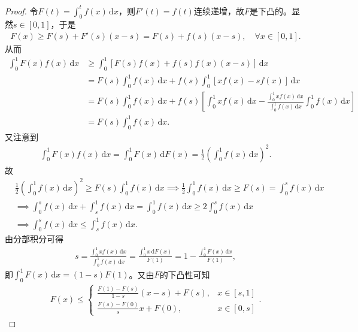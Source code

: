 \documentclass[../../main.tex]{subfiles}%
\begin{document}
\begin{proof}

令$F(t) = \int_0^t f(x) \, \mathrm{d}x$，则$F'(t) = f(t)$连续递增，故$F$是下凸的。显然$s \in [0,1]$，于是
\begin{align*}
F(x) \geqslant  F(s) + F'(s)(x - s) = F(s) + f(s)(x - s), \quad \forall x \in [0,1].
\end{align*}
从而
\begin{align*}
\int_0^1 F(x) f(x) \, \mathrm{d}x &\geqslant  \int_0^1 \left[ F(s) f(x) + f(s) f(x)(x - s) \right] \, \mathrm{d}x \\
&= F(s) \int_0^1 f(x) \, \mathrm{d}x + f(s) \int_0^1 \left[ x f(x) - s f(x) \right] \, \mathrm{d}x \\
&= F(s) \int_0^1 f(x) \, \mathrm{d}x + f(s) \left[ \int_0^1 x f(x) \, \mathrm{d}x - \frac{\int_0^1 x f(x) \, \mathrm{d}x}{\int_0^1 f(x) \, \mathrm{d}x} \int_0^1 f(x) \, \mathrm{d}x \right] \\
&= F(s) \int_0^1 f(x) \, \mathrm{d}x.
\end{align*}
又注意到
\begin{align*}
\int_0^1 F(x) f(x) \, \mathrm{d}x = \int_0^1 F(x) \, \mathrm{d}F(x) = \frac{1}{2} \left( \int_0^1 f(x) \, \mathrm{d}x \right)^2.
\end{align*}
故
\begin{align*}
&\frac{1}{2} \left( \int_0^1 f(x) \, \mathrm{d}x \right)^2 \geqslant  F(s) \int_0^1 f(x) \, \mathrm{d}x \implies \frac{1}{2} \int_0^1 f(x) \, \mathrm{d}x \geqslant  F(s) = \int_0^s f(x) \, \mathrm{d}x \\
&\implies \int_0^s f(x) \, \mathrm{d}x + \int_s^1 f(x) \, \mathrm{d}x = \int_0^1 f(x) \, \mathrm{d}x \geqslant  2 \int_0^s f(x) \, \mathrm{d}x \\
&\implies \int_0^s f(x) \, \mathrm{d}x \leqslant  \int_s^1 f(x) \, \mathrm{d}x.
\end{align*}
由分部积分可得
\begin{align*}
s = \frac{\int_0^1 x f(x) \, \mathrm{d}x}{\int_0^1 f(x) \, \mathrm{d}x} = \frac{\int_0^1 x \, \mathrm{d}F(x)}{F(1)} = 1 - \frac{\int_0^1 F(x) \, \mathrm{d}x}{F(1)},
\end{align*}
即$\int_0^1 F(x) \, \mathrm{d}x = (1 - s) F(1)$。又由$F$的下凸性可知
\begin{align*}
F(x) \leqslant  
\begin{cases}
\frac{F(1) - F(s)}{1 - s}(x - s) + F(s), & x \in [s,1] \\
\frac{F(s) - F(0)}{s}x + F(0), & x \in [0,s]
\end{cases}.

\end{align*}
\end{proof}
\end{document}

